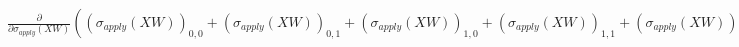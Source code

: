\documentclass[11pt]{article}
\newcommand{\prompt}[4]{
        \ttfamily\llap{{\color{#2}[#3]:\hspace{3pt}#4}}\vspace{-\baselineskip}
    }
\begin{document}
            
\prompt{Out}{outcolor}{44}{}
    
    $\displaystyle \frac{\partial}{\partial \sigma_{apply}{\left(X W \right)}} \left(\left(\sigma_{apply}{\left(X W \right)}\right)_{0, 0} + \left(\sigma_{apply}{\left(X W \right)}\right)_{0, 1} + \left(\sigma_{apply}{\left(X W \right)}\right)_{1, 0} + \left(\sigma_{apply}{\left(X W \right)}\right)_{1, 1} + \left(\sigma_{apply}{\left(X W \right)}\right)_{2, 0} + \left(\sigma_{apply}{\left(X W \right)}\right)_{2, 1}\right) \left. \frac{d}{d \xi_{1}} \sigma_{apply}{\left(\xi_{1} \right)} \right|_{\substack{ \xi_{1}=X W }} \frac{\partial}{\partial W} X W$

    

    


    
    
    
\end{document}
